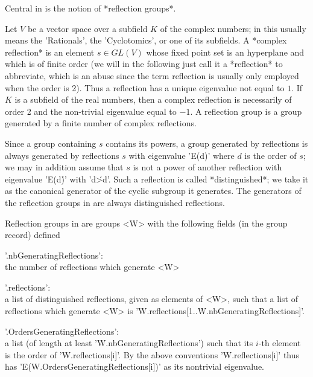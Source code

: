 

Central  in {\CHEVIE}  is the  notion of  *reflection groups*.

Let  $V$ be a vector  space over a subfield  $K$ of the complex numbers; in
{\GAP} this usually means the 'Rationals', the 'Cyclotomics', or one of its
subfields.  A *complex reflection*  is an element  $s\in GL(V)$ whose fixed
point  set is an  hyperplane and which  is of finite  order (we will in the
following  just call  it a  *reflection* to  abbreviate, which  is an abuse
since  the term reflection is  usually only employed when  the order is 2).
Thus  a reflection has  a unique eigenvalue  not equal to  $1$. If $K$ is a
subfield  of the real numbers, then  a complex reflection is necessarily of
order 2 and the non-trivial eigenvalue equal to $-1$. A reflection group is
a group generated by a finite number of complex reflections.

Since  a group  containing $s$  contains its  powers, a  group generated by
reflections  is always generated by  reflections $s$ with eigenvalue 'E(d)'
where  $d$ is the order of $s$; we may in addition assume that $s$ is not a
power  of another reflection with eigenvalue  'E(d\')' with 'd\'>d'. Such a
reflection is called *distinguished*; we take it as the canonical generator
of  the  cyclic  subgroup  it  generates.  The generators of the reflection
groups  in  {\CHEVIE}  are always distinguished reflections.

Reflection groups in {\CHEVIE} are groups <W> with the following fields (in
the group record) defined

'.nbGeneratingReflections':\\ the number of reflections which generate
         <W>

'.reflections':\\ a list of distinguished reflections, given as elements of
  <W>, such that a list of reflections which generate <W> is
  'W.reflections{[1..W.nbGeneratingReflections]}'.

'.OrdersGeneratingReflections':\\ a list (of length at least
  'W.nbGeneratingReflections')   such  that   its  $i$-th   element  is
  the   order  of   'W.reflections[i]'.   By   the  above   conventions
  'W.reflections[i]' thus  has 'E(W.OrdersGeneratingReflections[i])' as
  its nontrivial eigenvalue.

